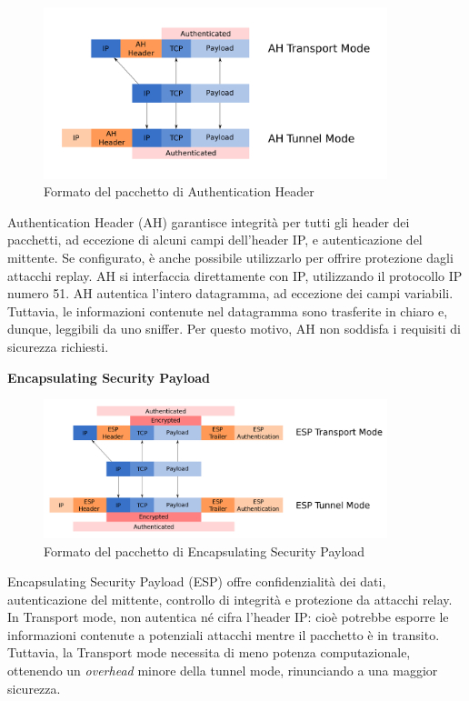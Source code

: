 \begin{figure}[ht]
    \centering
    \includegraphics[width=10cm]{figure/ah_tun_trasp.png}
    \caption{Formato del pacchetto di Authentication Header}
\end{figure}

Authentication Header \cite[RFC4302]{RFC4302} (AH) garantisce integrità per tutti gli header dei pacchetti, ad eccezione di alcuni campi dell'header IP, e autenticazione del mittente. Se configurato, è anche possibile utilizzarlo per offrire protezione dagli attacchi replay. AH si interfaccia direttamente con IP, utilizzando il protocollo IP numero 51.
AH autentica l'intero datagramma, ad eccezione dei campi variabili. Tuttavia, le informazioni contenute nel datagramma sono trasferite in chiaro e, dunque, leggibili da uno sniffer. Per questo motivo, AH non soddisfa i requisiti di sicurezza richiesti.

\noindent \textbf{Encapsulating Security Payload}

\begin{figure}[ht]
    \centering
    \includegraphics[width=10cm]{figure/esp_tun_trasp.png}
    \caption{Formato del pacchetto di Encapsulating Security Payload}
\end{figure}

Encapsulating Security Payload \cite[RFC4303]{RFC4303} (ESP) offre confidenzialità dei dati, autenticazione del mittente, controllo di integrità e protezione da attacchi relay.
In Transport mode, non autentica né cifra l'header IP: cioè potrebbe esporre le informazioni contenute a potenziali attacchi mentre il pacchetto è in transito.
Tuttavia, la Transport mode necessita di meno potenza computazionale, ottenendo un \emph{overhead} minore della tunnel mode, rinunciando a una maggior sicurezza.

